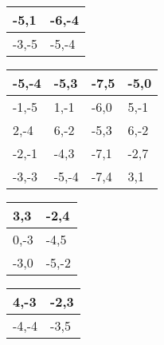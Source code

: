 \documentclass{article}
\begin{document}
\begin{table}[]
\centering
\begin{tabular}{|l|l|}
\hline-5,1 & -6,-4\\ \hline
-3,-5 & -5,-4\\ \hline
\end{tabular}
\end{table}

\begin{table}[]
\centering
\begin{tabular}{|l|l|l|l|}
\hline-5,-4 & -5,3 & -7,5 & -5,0\\ \hline
-1,-5 & 1,-1 & -6,0 & 5,-1\\ \hline
2,-4 & 6,-2 & -5,3 & 6,-2\\ \hline
-2,-1 & -4,3 & -7,1 & -2,7\\ \hline
-3,-3 & -5,-4 & -7,4 & 3,1\\ \hline
\end{tabular}
\end{table}

\begin{table}[]
\centering
\begin{tabular}{|l|l|}
\hline3,3 & -2,4\\ \hline
0,-3 & -4,5\\ \hline
-3,0 & -5,-2\\ \hline
\end{tabular}
\end{table}

\begin{table}[]
\centering
\begin{tabular}{|l|l|}
\hline4,-3 & -2,3\\ \hline
-4,-4 & -3,5\\ \hline
\end{tabular}
\end{table}
\end{document}
